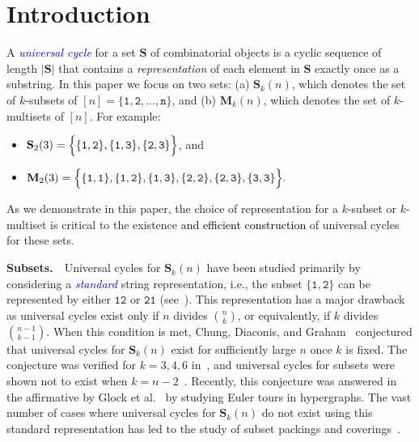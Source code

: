 \documentclass[US-letter,USenglish,authorcolumns,autoref]{lipics-v2021}
\renewcommand{\tt} {\mathtt}
\newcommand{\bS}{\mathbf{S}}
\newcommand{\bM}{\mathbf{M}}
\newcommand{\defo}[1] {\emph{\textcolor{blue}{#1}}}
\newcommand{\edit}[1]{\textcolor{black}{#1}}
\begin{document}
\section{Introduction}  \label{sec:intro}

A \defo{universal cycle} for a set $\mathbf{S}$ of combinatorial objects is a cyclic sequence of length $|\mathbf{S}|$ that contains a \emph{representation} of each element in $\mathbf{S}$ exactly once as a substring. 
In this paper we focus on two sets: (a) $\bS_k(n)$, which denotes the set of $k$-subsets of $[n] = \{\tt{1,2},\ldots, \tt{n}\}$, and (b) $\bM_k(n)$, which denotes the set of $k$-multisets of $[n]$.  For example:
%
\begin{itemize}

\item $ \bS_2(3) = \Bigl\{ \{\tt{1,2}\} ,\{\tt{1,3}\}, \{\tt{2,3}\}  \Bigr\}$, and 

\item $ \bM_2(3) = \Bigl\{ \{\tt{1,1}\} ,\{\tt{1,2}\}, \{\tt{1,3}\},  \{\tt{2,2}\} ,\{\tt{2,3}\}, \{\tt{3,3}\} \Bigr\}. $
\end{itemize}
%
\noindent 
%
As we demonstrate in this paper, the choice of representation for a $k$-subset or $k$-multiset is critical to the existence \edit{and efficient construction} of universal cycles for these sets.  
 


%

\medskip

\noindent
{\bf Subsets.}~~Universal cycles for $\mathbf{S}_k(n)$ have been studied primarily by considering a \defo{standard} string representation, i.e., the subset $\{\tt{1,2}\}$ can be represented by either $\tt{12}$ or $\tt{21}$ (see~\cite{chung,2009research,lanius,rudoy}).  This representation has a major drawback as universal cycles exist only if $n$ divides $n \choose k$, or equivalently, if $k$ divides ${n-1 \choose k-1}$.  When this condition is met, Chung, Diaconis, and Graham~\cite{chung} conjectured that universal cycles for $\mathbf{S}_k(n)$ exist for sufficiently large $n$ once $k$ is fixed. The conjecture was verified for $k = 3,4,6$ in~\cite{jackson,hurlbert}, and universal cycles for subsets were shown not to exist when $k=n-2$~\cite{minustwo}. Recently, this conjecture was answered in the affirmative by Glock et al.~\cite{Glock} by studying Euler tours in hypergraphs.  The vast number of cases where universal cycles for $\mathbf{S}_k(n)$ do not exist using this standard representation has led to the study of subset packings and coverings~\cite{near-cycles,packings}.  
\end{document}
